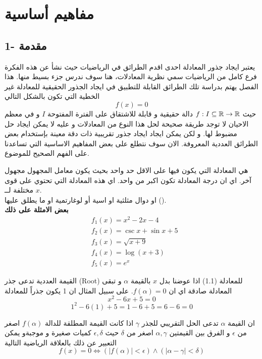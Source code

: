 \chapter{مفاهيم أساسية}

\section*{1- مقدمة}
يعتبر ايجاد جذور المعادلة احدى اقدم الطرائق في الرياضيات حيث نشأ عن هذه الفكرة فرع كامل من الرياضيات سمي نظرية المعادلات، هنا سوف ندرس جزء بسيط منها. هذا الفصل يهتم بدراسة تلك الطرائق القابلة للتطبيق في ايجاد الجذور الحقيقية للمعادلة غير الخطية التي تكون بالشكل التالي
\begin{equation}
	f(x) = 0
\end{equation} 
حيث $f:I\subseteq\mathbb{R}\to\mathbb{R}$ دالة حقيقية و قابلة للاشتقاق على الفترة المفتوحة $I$ و في معظم الاحيان لا توجد طريقة صحيحة لحل هذا النوع من المعادلات و عليه لا يمكن ايجاد حل مضبوط لها. و لكن يمكن ايجاد ايجاد جذور تقريبية ذات دقة معينة بإستخدام بعض الطرائق العددية المعروفة. الان سوف نتطلع على بعض المفاهيم الاساسية التي تساعدنا على الفهم الصحيح للموضوع.
\begin{definition}
	هي المعادلة التي يكون فيها على الاقل حد واحد بحيث يكون معامل المجهول مجهول آخر. اي ان درجة المعادلة تكون اكبر من واحد. اي هذه المعادلة التي تحتوي على قوى مختلفة لــ $x$.\\
	او دوال مثلثية او اسية أو لوغارتمية او ما يطلق عليها ().\\
	\textbf{بعض الامثلة على ذلك}
	\begin{align*}
		& f_1(x) = x^2 - 2x - 4\\
		&f_2(x) = \csc x + \sin x + 5\\
		&f_3(x) = \sqrt{x+9}\\
		&f_4(x) = \log(x+3) \\
		&f_5(x) = e^x
	\end{align*}
\end{definition}

\begin{definition}
	القيمة العددية تدعى جذر (Root) للمعادلة (1.1) اذا عوضنا بدل $x$ بالقيمة $\alpha$ و تبقى المعادلة صادقة اي ان $f(\alpha)=0$. على سبيل المثال ان 1 يكون جذراً للمعادلة
	\[
	x^2 - 6x + 5 =0
	\]
	\[
	1^2 -6(1) + 5 = 1 - 6 + 5 = 6 -6 = 0
	\]
\end{definition}

\begin{definition}
	ان القيمة $\alpha$ تدعى الحل التقريبي للجذر $\gamma$ اذا كانت القيمة المطلقة للدالة $f(\alpha)$ اصغر من $\epsilon$ و الفرق بين القيمتين $\alpha, \gamma$ اصغر من $\delta$ حيث $\epsilon, \delta$ كميات صغيرة و موجبةو يمكن التعبير عن ذلك بالعلاقة الرياضية التالية
	\[
	f(x) = 0 \iff (|f(\alpha)| < \epsilon) \wedge (|\alpha-\gamma|<\delta)
	\]
\end{definition}

